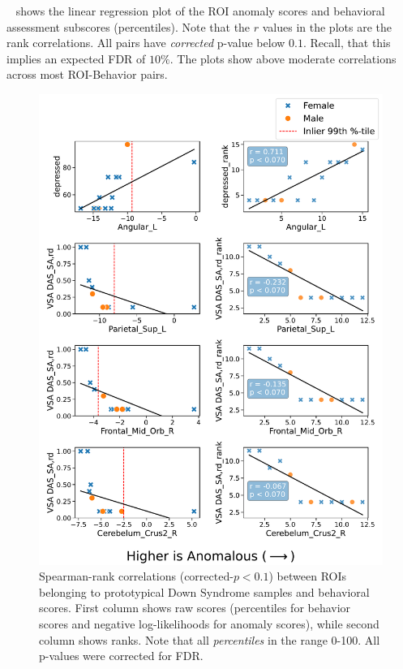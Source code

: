 ~ shows the linear regression plot of the ROI anomaly scores and behavioral assessment subscores (percentiles). Note that the $r$ values in the plots are the rank correlations. All pairs have \textit{corrected} p-value below $0.1$. Recall, that this implies an expected FDR of $10\%$. The plots show above moderate correlations across most ROI-Behavior pairs.

\begin{figure}[h!]
\centering
\includegraphics[width=\textwidth, height=1.25\linewidth]{figures/rankcorrplot-fig1.pdf}
\caption{Spearman-rank correlations ($\text{corrected-}p < 0.1$) between ROIs belonging to prototypical Down Syndrome samples and behavioral scores.
First column shows raw scores (percentiles for behavior scores and negative log-likelihoods for anomaly scores), while second column shows ranks. Note that all \textit{percentiles} in the range 0-100. All p-values were corrected for FDR.}
\label{fig:roi-scatter}
\end{figure}



